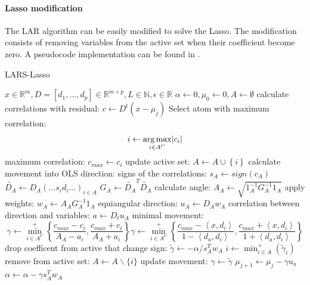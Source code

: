 \paragraph{Lasso modification}
The LAR algorithm can be easily modified to solve the Lasso. 
The modification consists of removing variables from the active set
when their coefficient become zero. A pseudocode implementation can be found in
.
\begin{algorithm}
\caption{LARS-Lasso}
\label{alg:lars}
\begin{algorithmic}[1]
\REQUIRE $x \in \mathbb{R}^m, D =[d_1,...,d_p] \in \mathbb{R}^{m\times p}, L \in
\mathbb{N}, \epsilon \in \mathbb{R}$
\STATE $\alpha \gets 0, \mu_{0} \gets 0, A \gets \emptyset$
\STATE calculate correlations with residual: $c \gets D^t\left( x-\mu_j \right)
$
\STATE Select atom with maximum correlation: 
\begin{equation*}
i \gets \argmax_{i \in A^C} \lvert c_i  \rvert %
\end{equation*}
\STATE maximum correlation: $c_{max} \gets c_i $ %
\STATE update active set: $A \gets A \cup \left\{i\right\} $
\STATE calculate movement into OLS direction:
\STATE signs of the correlations: $s_A \gets  sign\left(c_A\right)$
\STATE $\tilde{D_A} \gets D_A\left(\ldots s_id_i \ldots\right)_{i\in A}$
\STATE $G_A \gets \tilde{D_A}^T\tilde{D_A}$
\STATE calculate angle: $A_A \gets \sqrt{ 1_A^{-1} G_A^{-1} 1_A
}$
\STATE apply weights: $w_A \gets A_AG_A^{-1}1_A$
\STATE equiangular direction: $u_A \gets D_Aw_A$
\STATE correlation between direction and variables: $a \gets D_tu_A$
\STATE minimal movement:
\begin{equation*}
\gamma \gets \min_{i\in A^C}^{+} \left\lbrace \frac{c_{max}-c_i }{A_A-a_i },
\frac{c_{max}+c_i }{A_A+a_i } \right\rbrace
\gamma \gets \min_{i\in A^C}^{+} \left\lbrace \frac{c_{max}-\left< x,d_i
\right> }{1-\left< d_a,d_i \right> }, \frac{c_{max}+\left< x,d_i \right>
}{1+\left< d_a,d_i \right> } \right\rbrace
\end{equation*}
\STATE drop coefficent from active that change sign: 
\STATE $ \tilde{\gamma} \gets -\alpha/s_A^Tw_A  $
\STATE $ i \gets \min_{i\in A}^{+} \left( \tilde{\gamma}_i \right) $
\STATE remove from active set: $ A \gets A \backslash \{i\} $
\STATE update movement: $ \gamma \gets \tilde{\gamma} $  
\ENDIF
\STATE $ \mu_{j+1} \gets \mu_{j} - \gamma u_a $
\STATE $ \alpha \gets \alpha - \gamma s_A^Tw_A $
\ENDFOR
\end{algorithmic}
\end{algorithm}


